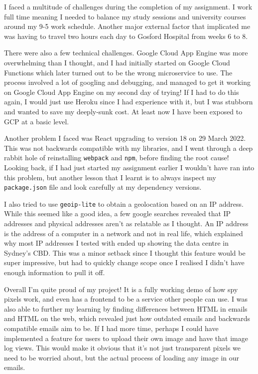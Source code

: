 \documentclass{article}
\begin{document}
I faced a multitude of challenges during the completion of my assignment. I work full time meaning I needed to balance my study sessions and university courses around my 9-5 work schedule. Another major external factor that implicated me was having to travel two hours each day to Gosford Hospital from weeks 6 to 8.

There were also a few technical challenges. Google Cloud App Engine was more overwhelming than I thought, and I had initially started on Google Cloud Functions which later turned out to be the wrong microservice to use. The process involved a lot of googling and debugging, and managed to get it working on Google Cloud App Engine on my second day of trying! If I had to do this again, I would just use Heroku since I had experience with it, but I was stubborn and wanted to save my deeply-sunk cost. At least now I have been exposed to GCP at a basic level.

Another problem I faced was React upgrading to version 18 on 29 March 2022. This was not backwards compatible with my libraries, and I went through a deep rabbit hole of reinstalling \texttt{webpack} and \texttt{npm}, before finding the root cause! Looking back, if I had just started my assignment earlier I wouldn't have ran into this problem, but another lesson that I learnt is to always inspect my \texttt{package.json} file and look carefully at my dependency versions.

I also tried to use \texttt{geoip-lite} to obtain a geolocation based on an IP address. While this seemed like a good idea, a few google searches revealed that IP addresses and physical addresses aren't as relatable as I thought. An IP address is the address of a computer in a network and not in real life, which explained why most IP addresses I tested with ended up showing the data centre in Sydney's CBD. This was a minor setback since I thought this feature would be super impressive, but had to quickly change scope once I realised I didn't have enough information to pull it off.

Overall I'm quite proud of my project! It is a fully working demo of how spy pixels work, and even has a frontend to be a service other people can use. I was also able to further my learning by finding differences between HTML in emails and HTML on the web, which revealed just how outdated emails and backwards compatible emails aim to be. If I had more time, perhaps I could have implemented a feature for users to upload their own image and have that image log views. This would make it obvious that it's not just transparent pixels we need to be worried about, but the actual process of loading any image in our emails.
\end{document}
